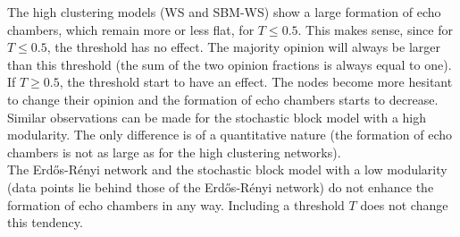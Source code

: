 \documentclass[11 pt , letterpaper , twoside , openright]{book}
\begin{document}
The high clustering models (WS and SBM-WS) show a large formation of echo chambers, which remain more or less flat, for $T \leqslant 0.5$. This makes sense, since for $T \leqslant 0.5$, the threshold has no effect. The majority opinion will always be larger than this threshold (the sum of the two opinion fractions is always equal to one). If $T \geqslant 0.5$, the threshold start to have an effect. The nodes become more hesitant to change their opinion and the formation of echo chambers starts to decrease.\\
Similar observations can be made for the stochastic block model with a high modularity. The only difference is of a quantitative nature (the formation of echo chambers is not as large as for the high clustering networks).\\
The Erd\H{o}s-R\'{e}nyi network and the stochastic block model with a low modularity (data points lie behind those of the Erd\H{o}s-R\'{e}nyi network) do not enhance the formation of echo chambers in any way. Including a threshold $T$ does not change this tendency. %
\end{document}
